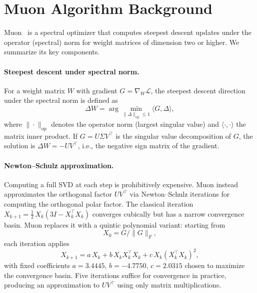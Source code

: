 \section{Muon Algorithm Background}
\label{sec:muon_background}

Muon~\cite{jordan2024muon} is a spectral optimizer that computes steepest descent updates under the operator (spectral) norm for weight matrices of dimension two or higher.
We summarize its key components.

\paragraph{Steepest descent under spectral norm.}
For a weight matrix $W$ with gradient $G = \nabla_W \mathcal{L}$, the steepest descent direction under the spectral norm is defined as
\begin{equation}
\label{eq:spectral_descent}
\Delta W = \arg\min_{\|\Delta\|_{\mathrm{op}} \leq 1} \langle G, \Delta \rangle,
\end{equation}
where $\|\cdot\|_{\mathrm{op}}$ denotes the operator norm (largest singular value) and $\langle \cdot, \cdot \rangle$ the matrix inner product.
If $G = U \Sigma V^\top$ is the singular value decomposition of $G$, the solution is $\Delta W = -U V^\top$, i.e., the negative sign matrix of the gradient.

\paragraph{Newton--Schulz approximation.}
Computing a full SVD at each step is prohibitively expensive.
Muon instead approximates the orthogonal factor $UV^\top$ via Newton--Schulz iterations for computing the orthogonal polar factor.
The classical iteration $X_{k+1} = \tfrac{1}{2}\, X_k (3I - X_k^\top X_k)$ converges cubically but has a narrow convergence basin.
Muon replaces it with a quintic polynomial variant: starting from
\begin{equation}
\label{eq:ns_init}
X_0 = G / \|G\|_F,
\end{equation}
each iteration applies
\begin{equation}
\label{eq:ns_iteration}
X_{k+1} = a\, X_k + b\, X_k X_k^\top X_k + c\, X_k (X_k^\top X_k)^2,
\end{equation}
with fixed coefficients $a = 3.4445$, $b = -4.7750$, $c = 2.0315$ chosen to maximize the convergence basin.
Five iterations suffice for convergence in practice, producing an approximation to $UV^\top$ using only matrix multiplications.


